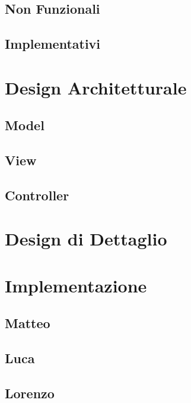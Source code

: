 \documentclass{article}
\begin{document}
    \subsection{Non Funzionali}

    \subsection{Implementativi}

    \newpage


    \section{Design Architetturale}

    \subsection{Model}

    \subsection{View}

    \subsection{Controller}

    \newpage


    \section{Design di Dettaglio}

    \newpage


    \section{Implementazione}

    \subsection{Matteo}

    \subsection{Luca}

    \subsection{Lorenzo}
\end{document}
